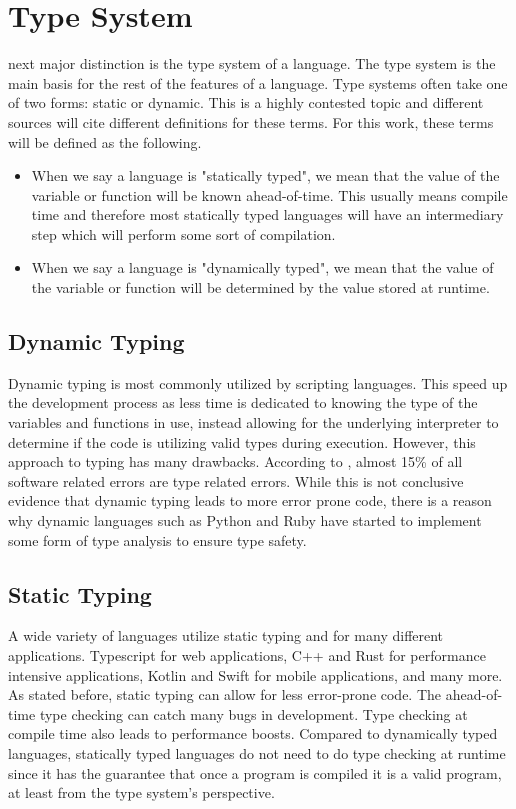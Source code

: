\documentclass[./subfile.tex]{subfiles}
\begin{document}
    \section{Type System}
         next major distinction is the type system of a language. The type system is the main basis for the rest of the features of a language. Type systems often take one of two forms: static or dynamic. This is a highly contested topic and different sources will cite different definitions for these terms. For this work, these terms will be defined as the following.
        
        \begin{itemize}
            \item When we say a language is "statically typed", we mean that the value of the variable or function will be known ahead-of-time. This usually means compile time and therefore most statically typed languages will have an intermediary step which will perform some sort of compilation.
            \item When we say a language is "dynamically typed", we mean that the value of the variable or function will be determined by the value stored at runtime. 
        \end{itemize}
        
        \subsection{Dynamic Typing}
            Dynamic typing is most commonly utilized by scripting languages. This speed up the development process as less time is dedicated to knowing the type of the variables and functions in use, instead allowing for the underlying interpreter to determine if the code is utilizing valid types during execution. However, this approach to typing has many drawbacks. According to , almost 15\% of all software related errors are type related errors\cite{7985711}. While this is not conclusive evidence that dynamic typing leads to more error prone code, there is a reason why dynamic languages such as Python\cite{python.org} and Ruby\cite{kuwabara_2021} have started to implement some form of type analysis to ensure type safety. 
        
        \subsection{Static Typing}
            A wide variety of languages utilize static typing and for many different applications. Typescript for web applications, C++ and Rust for performance intensive applications, Kotlin and Swift for mobile applications, and many more. As stated before, static typing can allow for less error-prone code. The ahead-of-time type checking can catch many bugs in development. Type checking at compile time also leads to performance boosts. Compared to dynamically typed languages, statically typed languages do not need to do type checking at runtime since it has the guarantee that once a program is compiled it is a valid program, at least from the type system's perspective. 
            
\end{document}
